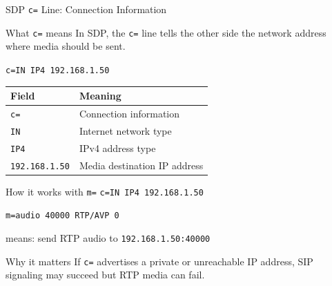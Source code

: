 \documentclass[aspectratio=169]{beamer}
\begin{document}
\begin{frame}{SDP \texttt{c=} Line: Connection Information}
\small

\begin{block}{What \texttt{c=} means}
In SDP, the \texttt{c=} line tells the other side the network address where media should be sent.
\end{block}

\vspace{0.25cm}

\begin{center}
\texttt{c=IN IP4 192.168.1.50}
\end{center}

\vspace{0.2cm}

\begin{center}
\begin{tabular}{ll}
\textbf{Field} & \textbf{Meaning} \\
\hline
\texttt{c=} & Connection information \\
\texttt{IN} & Internet network type \\
\texttt{IP4} & IPv4 address type \\
\texttt{192.168.1.50} & Media destination IP address \\
\end{tabular}
\end{center}

\vspace{0.25cm}

\begin{block}{How it works with \texttt{m=}}
\centering
\texttt{c=IN IP4 192.168.1.50}

\texttt{m=audio 40000 RTP/AVP 0}

\vspace{0.15cm}

means: send RTP audio to \texttt{192.168.1.50:40000}
\end{block}

\vspace{0.2cm}

\begin{alertblock}{Why it matters}
If \texttt{c=} advertises a private or unreachable IP address, SIP signaling may succeed but RTP media can fail.
\end{alertblock}

\end{frame}
\end{document}
